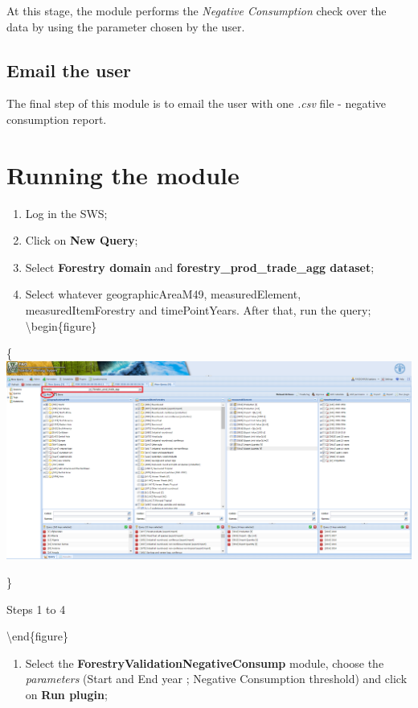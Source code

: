 \documentclass[
]{book}
\providecommand{\tightlist}{%
  \setlength{\itemsep}{0pt}\setlength{\parskip}{0pt}}
\begin{document}
At this stage, the module performs the \emph{Negative Consumption} check over the data by using the parameter chosen by the user.

\hypertarget{email-the-user-1}{%
\subsection{Email the user}\label{email-the-user-1}}

The final step of this module is to email the user with one \emph{.csv} file - negative consumption report.

\hypertarget{running-the-module-5}{%
\section{\texorpdfstring{\textbf{Running the module}}{Running the module}}\label{running-the-module-5}}

\begin{enumerate}
\def\labelenumi{\arabic{enumi}.}
\item
  Log in the SWS;
\item
  Click on \textbf{New Query};
\item
  Select \textbf{Forestry domain} and \textbf{forestry\_prod\_trade\_agg dataset};
\item
  Select whatever geographicAreaM49, measuredElement, measuredItemForestry and timePointYears. After that, run the query;
  \textbackslash begin\{figure\}
\end{enumerate}

\{\centering \includegraphics[width=1\linewidth]{images/forestry_prod_trade_agg_query}

\}

\caption{Steps 1 to 4}

\label{fig:queryNegConsump}
\textbackslash end\{figure\}

\begin{enumerate}
\def\labelenumi{\arabic{enumi}.}
\setcounter{enumi}{4}
\tightlist
\item
  Select the \textbf{ForestryValidationNegativeConsump} module, choose the \emph{parameters} (Start and End year ; Negative Consumption threshold) and click on \textbf{Run plugin};
\end{enumerate}
\end{document}
